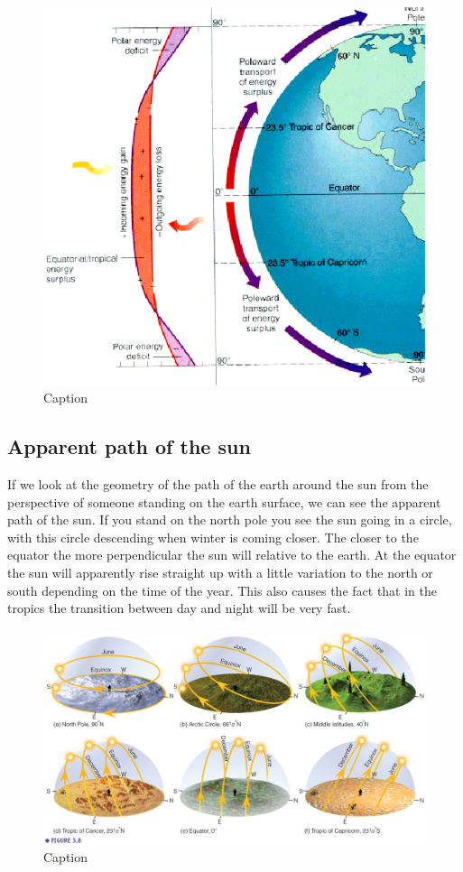 \documentclass[12pt,oneside]{book}
\begin{document}
\begin{figure}

{\centering \includegraphics[width=0.8\linewidth]{figures/Figure210} 

}

\caption{Caption}\label{fig:Insolation4}
\end{figure}

\subsection{Apparent path of the sun}\label{apparent-path-of-the-sun}

If we look at the geometry of the path of the earth around the sun from
the perspective of someone standing on the earth surface, we can see the
apparent path of the sun. If you stand on the north pole you see the sun
going in a circle, with this circle descending when winter is coming
closer. The closer to the equator the more perpendicular the sun will
relative to the earth. At the equator the sun will apparently rise
straight up with a little variation to the north or south depending on
the time of the year. This also causes the fact that in the tropics the
transition between day and night will be very fast.

\begin{figure}

{\centering \includegraphics[width=0.9\linewidth]{figures/Figure211} 

}

\caption{Caption}\label{fig:Path}
\end{figure}
\end{document}
